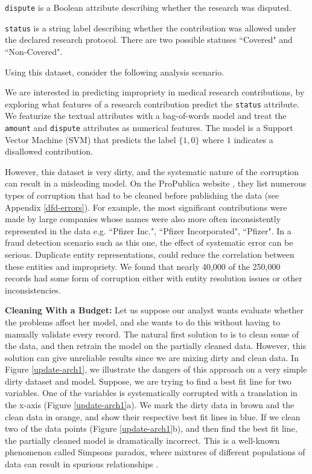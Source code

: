 \noindent\texttt{dispute} is a Boolean attribute describing whether the research was disputed.

\noindent\texttt{status} is a string label describing whether the contribution was allowed under the declared research protocol. There are two possible statuses ``Covered" and ``Non-Covered".

\vspace{0.5em}

\noindent Using this dataset, consider the following analysis scenario.
\begin{example}
We are interested in predicting impropriety in medical research contributions, by exploring what features of a research contribution predict the \texttt{status} attribute.
We featurize the textual attributes with a bag-of-words model and treat the \texttt{amount} and \texttt{dispute} attributes as numerical features.
The model is a Support Vector Machine (SVM) that predicts the label $\{1,0\}$ where $1$ indicates a disallowed contribution.
\end{example}

However, this dataset is very dirty, and the systematic nature of the corruption can result in a misleading model.
On the ProPublica website \cite{dollarsfordocs}, they list numerous types of corruption that had to be cleaned before publishing the data (see Appendix \ref{dfd-errors}).
For example, the most significant contributions were made by large companies whose names were also more often inconsistently represented in the data e.g. ``Pfizer Inc.", ``Pfizer Incorporated", ``Pfizer".
In a fraud detection scenario such as this one, the effect of systematic error can be serious.
Duplicate entity representations, could reduce the correlation between these entities and impropriety.
We found that nearly 40,000 of the 250,000 records had some form of corruption either with entity resolution issues or other inconsistencies.

\vspace{0.25em}

\noindent\textbf{Cleaning With a Budget: }  Let us suppose our analyst wants evaluate whether the problems affect her model, and she wants to do this without having to manually validate every record. 
The natural first solution to is to clean some of the data, and then retrain the model on the partially cleaned data.
However, this solution can give unreliable results since we are mixing dirty and clean data.
In Figure \ref{update-arch1}, we illustrate the dangers of this approach on a very simple dirty dataset and model.
Suppose, we are trying to find a best fit line for two variables. 
One of the variables is systematically corrupted with a translation in the x-axis (Figure \ref{update-arch1}a).
We mark the dirty data in brown and the clean data in orange, and show their respective best fit lines in blue.
If we clean two of the data points (Figure \ref{update-arch1}b), and then find the best fit line, the partially cleaned model is dramatically incorrect.
This is a well-known phenomenon called Simpsons paradox, where mixtures of different populations of data can result in spurious relationships \cite{simpson1951interpretation}.

